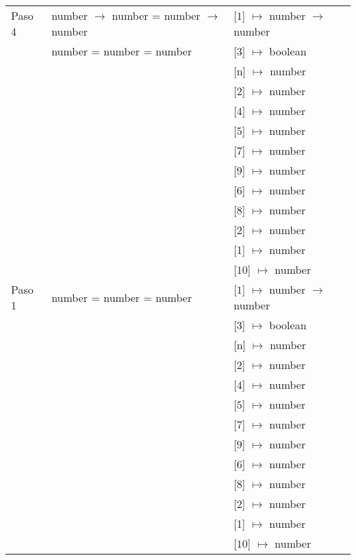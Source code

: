 \documentclass{article}
\begin{document}
\begin{center}
\begin{longtable}{ | l | p{10 cm} | p{5 cm} | }
 Paso 4  & number $\rightarrow$ number = number $\rightarrow$ number	& [$\boxed{1}$] $\mapsto$ number $\rightarrow$ number \\ 
	 & number = number = number					& [$\boxed{3}$] $\mapsto$ boolean \\ 
	 &	& [n] $\mapsto$ number \\
	 &	& [2] $\mapsto$ number \\
	 &	& [$\boxed{4}$] $\mapsto$ number \\
	 &	& [$\boxed{5}$] $\mapsto$ number \\
	 &	& [$\boxed{7}$] $\mapsto$ number \\ 
	 &	& [$\boxed{9}$] $\mapsto$ number \\ 
	 &	& [$\boxed{6}$] $\mapsto$ number \\ 
	 &	& [$\boxed{8}$] $\mapsto$ number \\ 
	 &	& [$\boxed{2}$] $\mapsto$ number \\ 
	 &	& [1] $\mapsto$ number \\ 
	 &	& [$\boxed{10}$] $\mapsto$ number \\ \hline
	 
 Paso 1  & number = number = number					& [$\boxed{1}$] $\mapsto$ number $\rightarrow$ number \\ 
	 &	& [$\boxed{3}$] $\mapsto$ boolean \\
	 &	& [n] $\mapsto$ number \\
	 &	& [2] $\mapsto$ number \\
	 &	& [$\boxed{4}$] $\mapsto$ number \\
	 &	& [$\boxed{5}$] $\mapsto$ number \\
	 &	& [$\boxed{7}$] $\mapsto$ number \\ 
	 &	& [$\boxed{9}$] $\mapsto$ number \\ 
	 &	& [$\boxed{6}$] $\mapsto$ number \\ 
	 &	& [$\boxed{8}$] $\mapsto$ number \\ 
	 &	& [$\boxed{2}$] $\mapsto$ number \\ 
	 &	& [1] $\mapsto$ number \\ 
	 &	& [$\boxed{10}$] $\mapsto$ number \\ \hline
	 

\end{longtable}
\end{center}
\end{document}
